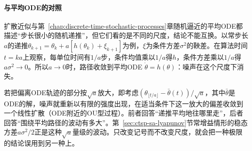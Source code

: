 \paragraph{与平均ODE的对照}
扩散近似与第~\ref{chap:discrete-time-stochastic-processes}章随机逼近的平均ODE都描述“步长很小的随机递推”，但它们看的是不同的尺度，结论不能互换。以常步长$a$的递推$\theta_{k+1}=\theta_k+a[h(\theta_k)+\xi_{k+1}]$为例，$\xi$为条件方差$\sigma^2$的鞅差。在算法时间$t=ka$上观察，每单位时间有$1/a$步，条件均值乘以$1/a$得$h$，条件方差乘以$1/a$得$a\sigma^2\to0$。所以$a\to0$时，路径收敛到平均ODE $\dot\theta=h(\theta)$：噪声在这个尺度下消失。

若把偏离ODE轨迹的部分按$\sqrt a$放大，即考虑$(\theta_{\lfloor t/a\rfloor}-\bar\theta(t))/\sqrt a$，其中$\bar\theta$是ODE的解，噪声就重新以有限的强度出现，在适当条件下这一放大的偏差收敛到一个线性扩散（ODE附近的OU型过程）。前者回答“递推平均地往哪里走”，后者回答“围绕平均路径的波动有多大”。第~\ref{sec:ctsp-sa-lyapunov}节常增益情形的稳态方差$a\sigma^2/2$正是这种$\sqrt a$量级的波动。只改变记号而不改变尺度，就会把一种极限的结论误用到另一种上。
